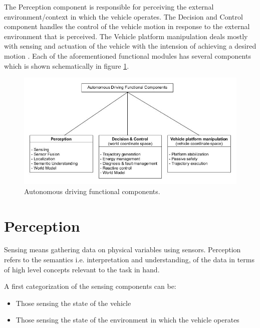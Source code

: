 The Perception component is responsible for perceiving the external environment/context in which the vehicle operates.  
The Decision and Control component handles the control of the vehicle motion in response to the external environment that is perceived. 
The Vehicle platform manipulation deals mostly with sensing and actuation of the vehicle with the intension of achieving a desired motion \cite{Bahere}.
Each of the aforementioned functional modules has several components which is shown schematically in figure \ref{autonomous_driving_components}. 



\begin{figure}[!htb]
\begin{center}
\includegraphics[scale=0.380]{img/autonomous_driving_components.jpg}
\end{center}
\caption{Autonomous driving functional components.}
\label{autonomous_driving_components}
\end{figure}


\section{Perception}

Sensing means gathering data on physical variables using sensors. Perception refers to the semantics 
i.e. interpretation and understanding, of the data in terms of high level concepts relevant to the task in hand.

A first categorization of the sensing components can be: \cite{Bahere, Serban}
\begin{itemize}
\item Those sensing the state of the vehicle 
\item Those sensing the state of the environment in which the vehicle operates
\end{itemize}


